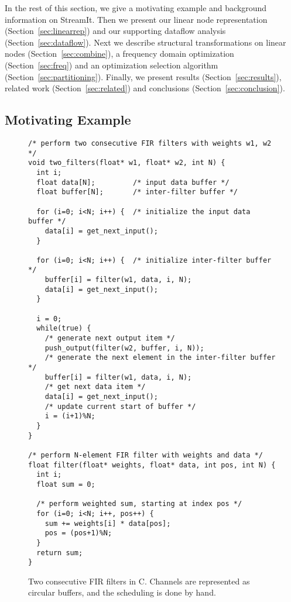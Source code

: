 In the rest of this section, we give a motivating example and
background information on StreamIt.  Then we present our linear node
representation (Section~\ref{sec:linearrep}) and our supporting
dataflow analysis (Section~\ref{sec:dataflow}).  Next we describe
structural transformations on linear nodes
(Section~\ref{sec:combine}), a frequency domain optimization
(Section~\ref{sec:freq}) and an optimization selection algorithm
(Section~\ref{sec:partitioning}). Finally, we present results
(Section~\ref{sec:results}), related work (Section~\ref{sec:related})
and conclusions (Section~\ref{sec:conclusion}).

\subsection{Motivating Example}
\begin{figure}[t]
\vspace{-6pt}
\center
\epsfxsize=3.0in
\vspace{-5pt}
\caption{Block diagram of two FIR filters.}
\vspace{-5pt}
\makeline
\vspace{-3pt}
\label{fig:motivating-fig}
\scriptsize
\begin{verbatim}
/* perform two consecutive FIR filters with weights w1, w2 */
void two_filters(float* w1, float* w2, int N) {
  int i;
  float data[N];         /* input data buffer */
  float buffer[N];       /* inter-filter buffer */
  
  for (i=0; i<N; i++) {  /* initialize the input data buffer */
    data[i] = get_next_input();
  }
  
  for (i=0; i<N; i++) {  /* initialize inter-filter buffer */
    buffer[i] = filter(w1, data, i, N);
    data[i] = get_next_input();
  }
  
  i = 0;
  while(true) {
    /* generate next output item */
    push_output(filter(w2, buffer, i, N));
    /* generate the next element in the inter-filter buffer */
    buffer[i] = filter(w1, data, i, N);
    /* get next data item */
    data[i] = get_next_input();
    /* update current start of buffer */
    i = (i+1)%N;
  }
}

/* perform N-element FIR filter with weights and data */
float filter(float* weights, float* data, int pos, int N) {
  int i;
  float sum = 0;

  /* perform weighted sum, starting at index pos */
  for (i=0; i<N; i++, pos++) {
    sum += weights[i] * data[pos];
    pos = (pos+1)%N;
  }
  return sum;
}
\end{verbatim}
\vspace{-18pt}
\caption{Two consecutive FIR filters in C.  Channels are represented
as circular buffers, and the scheduling is done by hand.
\protect\label{fig:motivating-example}}
\makeline
\vspace{-12pt}
\end{figure}

